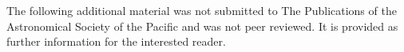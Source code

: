 \documentclass[twocolumn,twocolappendix]{aastex701}
\begin{document}
\begin{appendix}
\setcounter{equation}{0}
%


\setcounter{equation}{0}
%






\setcounter{equation}{0}
%

\end{appendix}




\begin{appendix}

  The following additional material was not submitted to The
  Publications of the Astronomical Society of the Pacific and was not peer reviewed.
  It is provided as further information for the interested reader. \\ [5mm]

\setcounter{section}{9}

%

\end{appendix}
\end{document}
